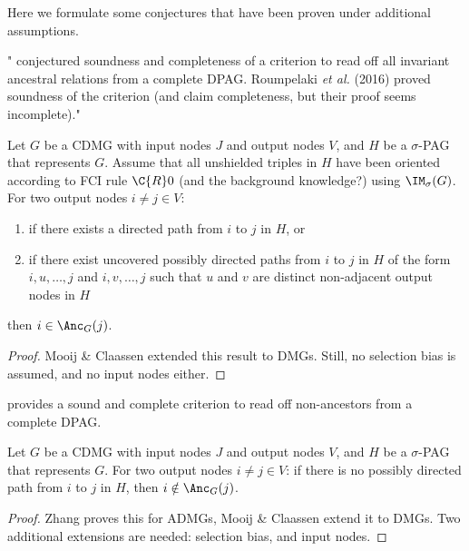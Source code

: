 Here we formulate some conjectures that have been proven under additional assumptions.

"\cite{Zhang2006} conjectured soundness and completeness of a criterion to read off all invariant ancestral relations from a complete DPAG.
Roumpelaki \emph{et al.} (2016) proved soundness of the criterion (and claim completeness, but their proof seems incomplete)."
\begin{Prp}
Let $G$ be a CDMG with input nodes $J$ and output nodes $V$, and $H$ be a $\sigma$-PAG that represents $G$.
Assume that all unshielded triples in $H$ have been oriented according to FCI rule $\C{R}0$ (and the background knowledge?) using $\IM_\sigma(G)$.
For two output nodes $i \ne j \in V$:
  \begin{enumerate}
    \item if there exists a directed path from $i$ to $j$ in $H$, or
    \item if there exist uncovered possibly directed paths from $i$ to $j$ in $H$ of the form $i, u, \dots, j$ and $i, v, \dots, j$ such that $u$ and $v$ are distinct non-adjacent output nodes in $H$
  \end{enumerate}
then $i \in \Anc_G(j)$.
\end{Prp}
\begin{proof}
  Mooij \& Claassen extended this result to DMGs.
  Still, no selection bias is assumed, and no input nodes either.
\end{proof}

\cite[p. 137]{Zhang2006} provides a sound and complete criterion to read off non-ancestors from a complete DPAG. 
\begin{Prp}
Let $G$ be a CDMG with input nodes $J$ and output nodes $V$, and $H$ be a $\sigma$-PAG that represents $G$.
For two output nodes $i \ne j \in V$:
if there is no possibly directed path from $i$ to $j$ in $H$, then $i \notin \Anc_G(j)$.
\end{Prp}
\begin{proof}
  Zhang proves this for ADMGs, Mooij \& Claassen extend it to DMGs.
  Two additional extensions are needed: selection bias, and input nodes.
\end{proof}
